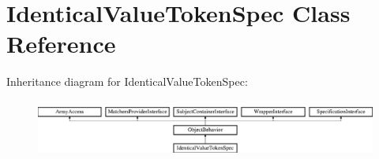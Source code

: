 \section{Identical\+Value\+Token\+Spec Class Reference}
\label{classspec_1_1_prophecy_1_1_argument_1_1_token_1_1_identical_value_token_spec}
Inheritance diagram for Identical\+Value\+Token\+Spec\+:\begin{figure}[H]
\begin{center}
\leavevmode
\includegraphics[height=1.953488cm]{classspec_1_1_prophecy_1_1_argument_1_1_token_1_1_identical_value_token_spec}
\end{center}
\end{figure}
